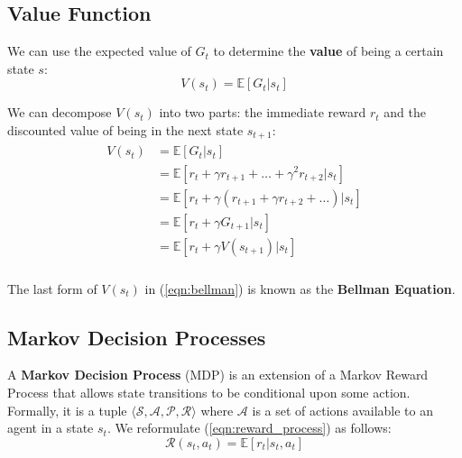 \documentclass[journal, onecolumn, 12pt, draftclsnofoot]{IEEEtran}
\newcommand{\kword}[1]{\textbf{#1}}
\newcommand{\mc}[1]{\mathcal{#1}}
\begin{document}
	\subsection{Value Function}
	\par We can use the expected value of $G_t$ to determine the \kword{value} of being a certain state $s$:
	\begin{equation}
		\label{eqn:value}
		V(s_t) = \mathbb{E}\left[ G_t \big\vert s_t \right]
	\end{equation}

	We can decompose $V(s_t)$ into two parts: the immediate reward $r_t$ and the discounted value of being in the next state $s_{t+1}$:
	\begin{align}
		\label{eqn:bellman}
		\begin{split}
			V(s_t) &= \mathbb{E} \left[ G_t \big\vert s_t \right] \\
					&= \mathbb{E} \left[ r_{t} + \gamma r_{t+1} + \dots + \gamma^2 r_{t+2} \big\vert s_t \right] \\
					&= \mathbb{E}\left[r_{t} + \gamma (r_{t+1} + \gamma r_{t+2} + \dots) \big\vert s_t \right] \\
					&= \mathbb{E}\left[ r_{t} + \gamma G_{t+1} \big\vert s_t \right] \\
					&= \mathbb{E} \left[ r_{t} + \gamma V(s_{t+1}) \big\vert s_t \right] \\
		\end{split}
	\end{align}

	The last form of $V(s_t)$ in (\ref{eqn:bellman}) is known as the \kword{Bellman Equation}.

	\subsection{Markov Decision Processes}
	\par A \kword{Markov Decision Process} (MDP) is an extension of a Markov Reward Process that allows state transitions to be conditional upon some action. Formally, it is a tuple $\langle \mc{S}, \mc{A}, \mc{P}, \mc{R} \rangle$ where $\mc{A}$ is a set of actions available to an agent in a state $s_t$. We reformulate (\ref{eqn:reward_process}) as follows:
		\begin{equation}
			\label{eqn:decision_process}
			\mc{R}(s_t, a_t) = \mathbb{E}\left[r_{t} \big\vert s_t, a_t \right]
		\end{equation}
\end{document}
